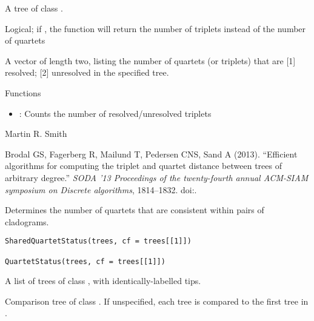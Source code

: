 \documentclass[a4paper]{book}
\begin{document}
%
\begin{Arguments}
\begin{ldescription}
\item[\code{tree}] A tree of class .

\item[\code{countTriplets}] Logical; if , the function will return the number
of triplets instead of the number of quartets
\end{ldescription}
\end{Arguments}
%
\begin{Value}
A vector of length two, listing the number of quartets (or triplets)
that are [1] resolved; [2] unresolved in the specified tree.
\end{Value}
%
\begin{Section}{Functions}
\begin{itemize}

\item {}: Counts the number of resolved/unresolved triplets

\end{itemize}
\end{Section}
%
\begin{Author}\relax
Martin R. Smith
\end{Author}
%
\begin{References}\relax
Brodal GS, Fagerberg R, Mailund T, Pedersen CNS, Sand A (2013).
``Efficient algorithms for computing the triplet and quartet distance between trees of arbitrary degree.''
\emph{SODA '13 Proceedings of the twenty-fourth annual ACM-SIAM symposium on Discrete algorithms}, 1814--1832.
doi:\nobreakspace{}.
\end{References}
%
\begin{Description}\relax
Determines the number of quartets that are consistent within pairs of
cladograms.
\end{Description}
%
\begin{Usage}
\begin{verbatim}
SharedQuartetStatus(trees, cf = trees[[1]])

QuartetStatus(trees, cf = trees[[1]])
\end{verbatim}
\end{Usage}
%
\begin{Arguments}
\begin{ldescription}
\item[\code{trees}] A list of trees of class , with identically-labelled tips.

\item[\code{cf}] Comparison tree of class .  If unspecified,
each tree is compared to the first tree in .
\end{ldescription}
\end{Arguments}
\end{document}
